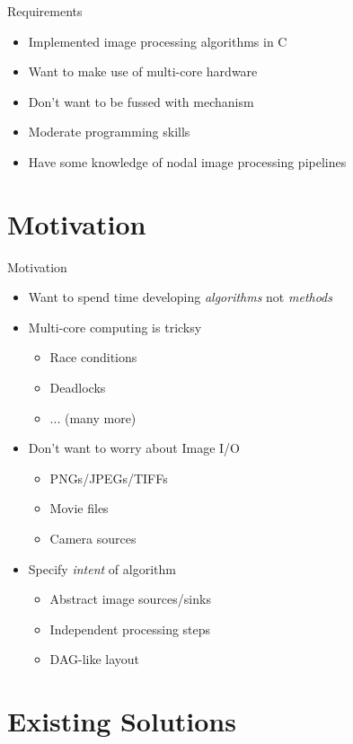 \documentclass{beamer}
\newcommand{\bi}{\begin{itemize}}
\newcommand{\ei}{\end{itemize}}
\begin{document}
\begin{frame}{Requirements}
  \bi

  \item Implemented image processing algorithms in C

  \item Want to make use of multi-core hardware

  \item Don't want to be fussed with mechanism

  \item Moderate programming skills

  \item Have some knowledge of nodal image processing pipelines

  \ei
\end{frame}


\section{Motivation} %

\begin{frame}{Motivation}
  \bi

  \item Want to spend time developing \emph{algorithms} not \emph{methods}

  \item Multi-core computing is tricksy
  \bi
    \item Race conditions
    \item Deadlocks
    \item ... (many more)
  \ei

  \item Don't want to worry about Image I/O
  \bi
    \item PNGs/JPEGs/TIFFs
    \item Movie files
    \item Camera sources
  \ei

  \item Specify \emph{intent} of algorithm
  \bi
    \item Abstract image sources/sinks
    \item Independent processing steps
    \item DAG-like layout
  \ei

  \ei
\end{frame}


\section{Existing Solutions} %
\end{document}
